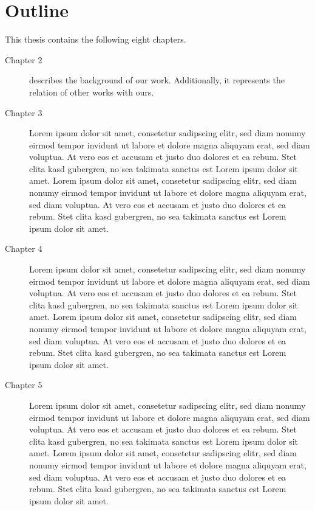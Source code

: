 \documentclass[11pt,oneside,a4paper]{book}
\begin{document}
\section{Outline}

This thesis contains the following eight chapters.

\begin{description}
\item[Chapter 2] describes the background of our work. Additionally, it represents the relation of other works with ours.

\item[Chapter 3] Lorem ipsum dolor sit amet, consetetur sadipscing elitr, sed diam nonumy eirmod tempor invidunt ut labore et dolore magna aliquyam erat, sed diam voluptua. At vero eos et accusam et justo duo dolores et ea rebum. Stet clita kasd gubergren, no sea takimata sanctus est Lorem ipsum dolor sit amet. Lorem ipsum dolor sit amet, consetetur sadipscing elitr, sed diam nonumy eirmod tempor invidunt ut labore et dolore magna aliquyam erat, sed diam voluptua. At vero eos et accusam et justo duo dolores et ea rebum. Stet clita kasd gubergren, no sea takimata sanctus est Lorem ipsum dolor sit amet.

\item[Chapter 4] Lorem ipsum dolor sit amet, consetetur sadipscing elitr, sed diam nonumy eirmod tempor invidunt ut labore et dolore magna aliquyam erat, sed diam voluptua. At vero eos et accusam et justo duo dolores et ea rebum. Stet clita kasd gubergren, no sea takimata sanctus est Lorem ipsum dolor sit amet. Lorem ipsum dolor sit amet, consetetur sadipscing elitr, sed diam nonumy eirmod tempor invidunt ut labore et dolore magna aliquyam erat, sed diam voluptua. At vero eos et accusam et justo duo dolores et ea rebum. Stet clita kasd gubergren, no sea takimata sanctus est Lorem ipsum dolor sit amet.

\item[Chapter 5] Lorem ipsum dolor sit amet, consetetur sadipscing elitr, sed diam nonumy eirmod tempor invidunt ut labore et dolore magna aliquyam erat, sed diam voluptua. At vero eos et accusam et justo duo dolores et ea rebum. Stet clita kasd gubergren, no sea takimata sanctus est Lorem ipsum dolor sit amet. Lorem ipsum dolor sit amet, consetetur sadipscing elitr, sed diam nonumy eirmod tempor invidunt ut labore et dolore magna aliquyam erat, sed diam voluptua. At vero eos et accusam et justo duo dolores et ea rebum. Stet clita kasd gubergren, no sea takimata sanctus est Lorem ipsum dolor sit amet.


\end{description}
\end{document}
